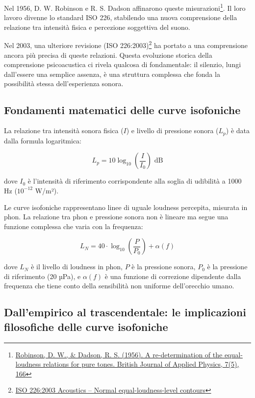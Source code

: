 \documentclass{gs-adonis}
\begin{document}
Nel 1956, D. W. Robinson e R. S. Dadson affinarono queste
misurazioni\footnote{\href{https://doi.org/10.1121/1.1919119}{Robinson,
  D. W., \& Dadson, R. S. (1956). A re-determination of the
  equal-loudness relations for pure tones. British Journal of Applied
  Physics, 7(5), 166}}. Il loro lavoro divenne lo standard ISO 226,
stabilendo una nuova comprensione della relazione tra intensità fisica e
percezione soggettiva del suono.

Nel 2003, una ulteriore revisione (ISO 226:2003)\footnote{\href{https://www.iso.org/standard/34222.html}{ISO
  226:2003 Acoustics -- Normal equal-loudness-level contours}} ha
portato a una comprensione ancora più precisa di queste relazioni.
Questa evoluzione storica della comprensione psicoacustica ci rivela
qualcosa di fondamentale: il silenzio, lungi dall'essere una semplice
assenza, è una struttura complessa che fonda la possibilità stessa
dell'esperienza sonora.

\subsection{Fondamenti matematici delle curve
isofoniche}\label{fondamenti-matematici-delle-curve-isofoniche}

La relazione tra intensità sonora fisica (\(I\)) e livello di pressione
sonora (\(L_p\)) è data dalla formula logaritmica:

\[L_p = 10 \log_{10}\left(\frac{I}{I_0}\right) \text{ dB}\]

dove \(I_0\) è l'intensità di riferimento corrispondente alla soglia di
udibilità a 1000 Hz (\(10^{-12}\) W/m²).

Le curve isofoniche rappresentano linee di uguale loudness percepita,
misurata in phon. La relazione tra phon e pressione sonora non è lineare
ma segue una funzione complessa che varia con la frequenza:

\[L_N = 40 \cdot \log_{10}\left(\frac{P}{P_0}\right) + \alpha(f)\]

dove \(L_N\) è il livello di loudness in phon, \(P\) è la pressione
sonora, \(P_0\) è la pressione di riferimento (20 µPa), e \(\alpha(f)\)
è una funzione di correzione dipendente dalla frequenza che tiene conto
della sensibilità non uniforme dell'orecchio umano.

\subsection{Dall'empirico al trascendentale: le implicazioni filosofiche
delle curve
isofoniche}\label{dallempirico-al-trascendentale-le-implicazioni-filosofiche-delle-curve-isofoniche}
\end{document}
